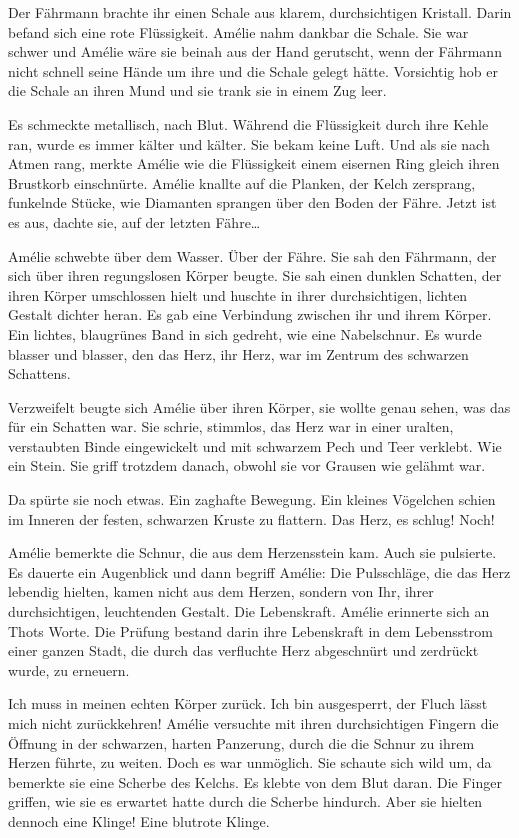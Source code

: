 \documentclass[11pt,titlepage,a5paper]{book}
\begin{document}
Der Fährmann brachte ihr einen Schale aus klarem, durchsichtigen Kristall. Darin befand sich eine rote Flüssigkeit. Amélie nahm dankbar die Schale. Sie war schwer und Amélie wäre sie beinah aus der Hand gerutscht, wenn der Fährmann nicht schnell seine Hände um ihre und die Schale gelegt hätte. Vorsichtig hob er die Schale an ihren Mund und sie trank sie in einem Zug leer.

Es schmeckte metallisch, nach Blut. Während die Flüssigkeit durch ihre Kehle ran, wurde es immer kälter und kälter. Sie bekam keine Luft. Und als sie nach Atmen rang, merkte Amélie wie die Flüssigkeit einem eisernen Ring gleich ihren Brustkorb einschnürte. Amélie knallte auf die Planken, der Kelch zersprang, funkelnde Stücke, wie Diamanten sprangen über den Boden der Fähre. Jetzt ist es aus, dachte sie, auf der letzten Fähre\dots 

Amélie schwebte über dem Wasser. Über der Fähre. Sie sah den Fährmann, der sich über ihren regungslosen Körper beugte. Sie sah einen dunklen Schatten, der ihren Körper umschlossen hielt und huschte in ihrer durchsichtigen, lichten Gestalt dichter heran. Es gab eine Verbindung zwischen ihr und ihrem Körper. Ein lichtes, blaugrünes Band in sich gedreht, wie eine Nabelschnur. Es wurde blasser und blasser, den das Herz, ihr Herz, war im Zentrum des schwarzen Schattens.

Verzweifelt beugte sich Amélie über ihren Körper, sie wollte genau sehen, was das für ein Schatten war. Sie schrie, stimmlos, das Herz war in einer uralten, verstaubten Binde eingewickelt und mit schwarzem Pech und Teer verklebt. Wie ein Stein. Sie griff trotzdem danach, obwohl sie vor Grausen wie gelähmt war. 

Da spürte sie noch etwas. Ein zaghafte Bewegung. Ein kleines Vögelchen schien  im Inneren der festen, schwarzen Kruste zu flattern. Das Herz, es schlug! Noch!

Amélie bemerkte die Schnur, die aus dem Herzensstein kam. Auch sie pulsierte. Es dauerte ein Augenblick und dann begriff Amélie: Die Pulsschläge, die das Herz lebendig hielten, kamen nicht aus dem Herzen, sondern von Ihr, ihrer durchsichtigen, leuchtenden Gestalt. Die Lebenskraft.  Amélie erinnerte sich an Thots Worte. Die Prüfung bestand darin ihre Lebenskraft in dem Lebensstrom einer ganzen Stadt, die durch das verfluchte Herz abgeschnürt und zerdrückt wurde, zu erneuern.

Ich muss in meinen echten Körper zurück. Ich bin ausgesperrt, der Fluch lässt mich nicht zurückkehren! Amélie versuchte mit ihren durchsichtigen Fingern die Öffnung in der schwarzen, harten Panzerung, durch die die Schnur zu ihrem Herzen führte, zu weiten. Doch es war unmöglich. Sie schaute sich wild um, da bemerkte sie eine Scherbe des Kelchs. Es klebte von dem Blut daran. Die Finger griffen, wie sie es erwartet hatte durch die Scherbe hindurch. Aber sie hielten dennoch eine Klinge! Eine blutrote Klinge. 
\end{document}
